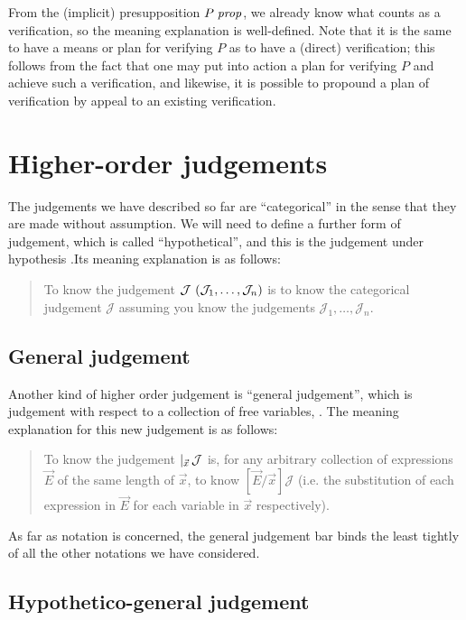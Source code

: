 \documentclass[main.tex]{subfiles}
\begin{document}
From the (implicit) presupposition $P\;\mathit{prop}$, we already know what
counts as a verification, so the meaning explanation is
well-defined. Note that it is the same to have a means or plan for
verifying $P$ as to have a (direct) verification; this follows from
the fact that one may put into action a plan for verifying $P$ and
achieve such a verification, and likewise, it is possible to propound
a plan of verification by appeal to an existing verification.

\section{Higher-order judgements}

The judgements we have described so far are ``categorical'' in the sense that
they are made without assumption. We will need to define a further form of
judgement, which is called ``hypothetical'', and this is the judgement under
hypothesis .Its
meaning explanation is as follows:

\begin{quote}
  To know the judgement $\mathcal{J}\ (\mathcal{J}_1,\dots,\mathcal{J}_n)$ is to know the
  categorical judgement $\mathcal{J}$ assuming you know the judgements
  $\mathcal{J}_1,\dots,\mathcal{J}_n$.
\end{quote}

\subsection{General judgement}

Another kind of higher order judgement is ``general judgement'', which is
judgement with respect to a collection of free variables,
. The meaning explanation for this new
judgement is as follows:

\begin{quote}
  To know the judgement $\lvert_{\vec{x}}\,\mathcal{J}$ is, for any arbitrary
  collection of expressions $\vec{E}$ of the same length of $\vec{x}$, to know
  $[\vec{E}/\vec{x}]\mathcal{J}$ (i.e. the substitution of each expression in
  $\vec{E}$ for each variable in $\vec{x}$ respectively).
\end{quote}

As far as notation is concerned, the general judgement bar binds the least
tightly of all the other notations we have considered.

\subsection{Hypothetico-general judgement}
\end{document}
